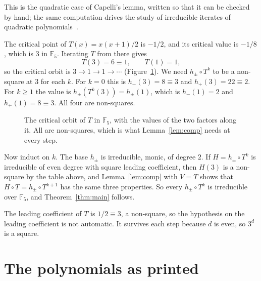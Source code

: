 \documentclass[11pt]{article}
\theoremstyle{remark}
\newcommand{\F}{\mathbb{F}}
\begin{document}
This is the quadratic case of Capelli's lemma, written so that it can be checked by hand; the same computation drives the study of irreducible iterates of quadratic polynomials~\cite{Jones,JonesBoston,GNOS}.

The critical point of $T(x)=x(x+1)/2$ is $-1/2$, and its critical value is $-1/8$, which is $3$ in $\F_5$. Iterating $T$ from there gives
\[
T(3)=6\equiv1,\qquad T(1)=1,
\]
so the critical orbit is $3\to1\to1\to\cdots$ (Figure~\ref{fig:orbit}). We need $h_\pm\circ T^{k}$ to be a non-square at $3$ for each $k$. For $k=0$ this is $h_-(3)=8\equiv3$ and $h_+(3)=22\equiv2$. For $k\ge1$ the value is $h_\pm(T^{k}(3))=h_\pm(1)$, which is $h_-(1)=2$ and $h_+(1)=8\equiv3$. All four are non-squares.

\begin{figure}[h]
\centering
{}
\caption{The critical orbit of $T$ in $\F_5$, with the values of the two factors along it. All are non-squares, which is what Lemma~\ref{lem:comp} needs at every step.}
\label{fig:orbit}
\end{figure}

Now induct on $k$. The base $h_\pm$ is irreducible, monic, of degree $2$. If $H=h_\pm\circ T^{k}$ is irreducible of even degree with square leading coefficient, then $H(3)$ is a non-square by the table above, and Lemma~\ref{lem:comp} with $V=T$ shows that $H\circ T=h_\pm\circ T^{k+1}$ has the same three properties. So every $h_\pm\circ T^{k}$ is irreducible over $\F_5$, and Theorem~\ref{thm:main} follows.

The leading coefficient of $T$ is $1/2\equiv3$, a non-square, so the hypothesis on the leading coefficient is not automatic. It survives each step because $d$ is even, so $3^d$ is a square.

\section{The polynomials as printed}\label{sec:printed}
\end{document}
